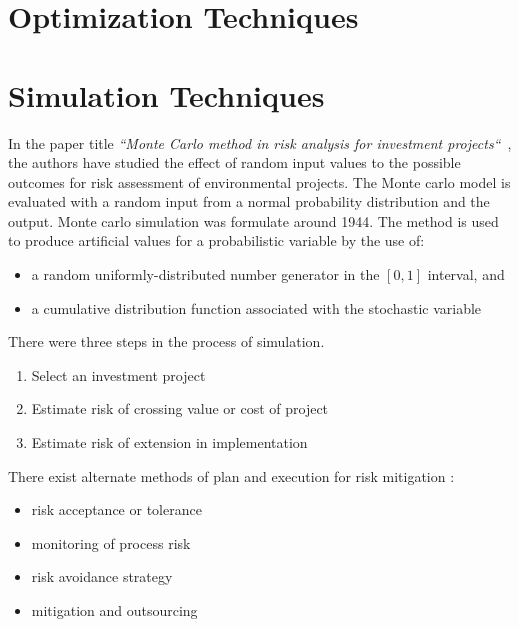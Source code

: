 %

%
%
%

\setlength{\footskip}{8mm}

\section{Optimization Techniques} 
\label{optimization-techniques}

%
%
%
%

\setlength{\footskip}{8mm}

\section{Simulation Techniques} 
\label{visualization-techniques}

In the paper title \textit{``Monte Carlo method in risk analysis for investment projects``}~, the authors have studied the effect of random input values to the possible outcomes for risk assessment of environmental projects. The Monte carlo model is evaluated with a random input from a normal probability distribution and the output. 
Monte carlo simulation was formulate around 1944. The method is used to produce artificial values for a probabilistic variable by the use of:
\begin{itemize}
	\item a random uniformly-distributed number generator in the $ [0,1] $ interval, and
	\item a cumulative distribution function associated with the stochastic variable
\end{itemize} 
There were three steps in the process of simulation. 
\begin{enumerate}
	\item Select an investment project
	\item Estimate risk of crossing value or cost of project
	\item Estimate risk of extension in implementation
\end{enumerate}
There exist alternate methods of plan and execution for risk mitigation :
\begin{itemize}
	\item risk acceptance or tolerance
	\item monitoring of process risk
	\item risk avoidance strategy
	\item mitigation and outsourcing
\end{itemize}

